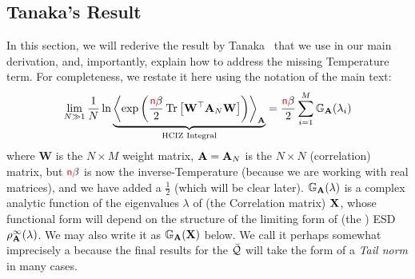 \subsection{Tanaka's Result}
\label{sxn:tanaka}

In this section, we will rederive the result by Tanaka~\cite{Tanaka2007,Tanaka2008} that we use in our main derivation,
and, importantly, explain how to address the missing Temperature term.
For completeness, we restate it here using the notation of the main text:
\begin{equation}
  \label{eqn:hciz}
  \lim_{N \gg 1} \frac{1}{N} \ln 
\underbrace{
  \Expected[\mathbf{\AMAT}]{
    \exp\left(\frac{\ND\beta}{2}
    \Trace{\mathbf{W}^{\top} \AMAT_N \mathbf{W}}
    \right)
  }
 }_{\text{HCIZ Integral}}
  = \frac{\ND\beta}{2} \sum_{i=1}^{M} \GNORM(\lambda_{i})
\end{equation}
where 
$\mathbf{W}$ is the $N\times M$ \Teacher weight matrix, 
$\mathbf{A}=\mathbf{A}_N$ is the $N\times N$ \Student (correlation) matrix, 
but ${\color{red}\sf{n}}\beta$ is now the inverse-Temperature (because we are working with real matrices),
and we have added a $\tfrac{1}{2}$ (which will be clear later).
$\mathbb{G}_{\mathbf{A}}(\lambda)$ is a complex analytic function of the eigenvalues $\lambda$ of (the \Teacher Correlation matrix) $\mathbf{X}$, 
whose functional form will depend on the structure of the limiting form of (the \Student) ESD $\rho_{\mathbf{A}}^{\infty}(\lambda)$.
We may also write it as $\mathbb{G}_{\mathbf{A}}(\mathbf{X})$ below.
We call it perhaps somewhat imprecisely a  \emph{\GEN} because the final results for the \LayerQuality  $\bar{\mathcal{Q}}$ will take the form of a \emph{Tail norm} in many cases.


